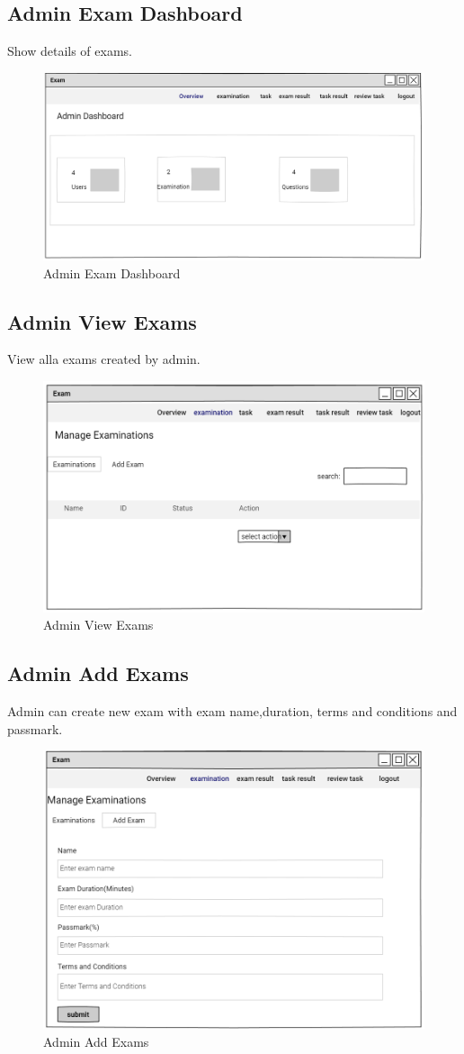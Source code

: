 \documentclass[a4paper,12pt]{report}
\begin{document}
\subsection {Admin Exam Dashboard}
Show details of exams.
\begin{figure}[bph]
	\centering
	\includegraphics[width=.6\linewidth]{img/admin/overview}
	\caption{Admin Exam Dashboard}
\end{figure}

\subsection {Admin View  Exams}
View alla exams created by admin.
\begin{figure}[bph]
	\centering
	\includegraphics[width=.5\linewidth]{img/admin/e1}
	\caption{Admin View  Exams}
\end{figure}
\pagebreak
\subsection {Admin Add Exams}
Admin can create new exam with exam name,duration, terms and conditions and passmark.
\begin{figure}[bph]
	\centering
	\includegraphics[width=.5\linewidth]{img/admin/add_exam}
	\caption{Admin Add Exams}
\end{figure}
\end{document}
